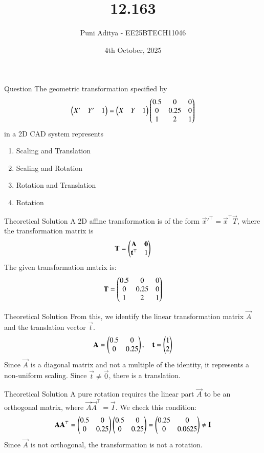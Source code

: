 \documentclass{beamer}
\title{12.163}
\date{4th October, 2025}
\author{Puni Aditya - EE25BTECH11046}
\begin{document}
\frame{\titlepage}
\begin{frame}{Question}
The geometric transformation specified by
\begin{align*}
    \begin{pmatrix}X' & Y' & 1\end{pmatrix} = \begin{pmatrix}X & Y & 1\end{pmatrix} \begin{pmatrix}0.5 & 0 & 0 \\ 0 & 0.25 & 0 \\ 1 & 2 & 1\end{pmatrix}
\end{align*}
in a 2D CAD system represents
\begin{enumerate}
    \item Scaling and Translation
    \item Scaling and Rotation
    \item Rotation and Translation
    \item Rotation
\end{enumerate}
\end{frame}

\begin{frame}{Theoretical Solution}
A 2D affine transformation is of the form $\vec{x}'^\top = \vec{x}^\top\vec{T}$, where the transformation matrix is
\begin{align*}
    \mathbf{T} = \begin{pmatrix}
        \mathbf{A} & \mathbf{0} \\
        \mathbf{t}^\top & 1
    \end{pmatrix}
\end{align*}
The given transformation matrix is:
\begin{align}
    \mathbf{T} = \begin{pmatrix}0.5 & 0 & 0 \\ 0 & 0.25 & 0 \\ 1 & 2 & 1\end{pmatrix}
\end{align}
\end{frame}

\begin{frame}{Theoretical Solution}
From this, we identify the linear transformation matrix $\vec{A}$ and the translation vector $\vec{t}$.
\begin{align}
    \mathbf{A} = \begin{pmatrix}0.5 & 0 \\ 0 & 0.25\end{pmatrix}, \quad \mathbf{t} = \begin{pmatrix}1 \\ 2\end{pmatrix}
\end{align}
Since $\vec{A}$ is a diagonal matrix and not a multiple of the identity, it represents a non-uniform scaling. Since $\vec{t} \neq \vec{0}$, there is a translation.
\end{frame}

\begin{frame}{Theoretical Solution}
A pure rotation requires the linear part $\vec{A}$ to be an orthogonal matrix, where $\vec{A}\vec{A}^\top = \vec{I}$. We check this condition:
\begin{align}
    \mathbf{A}\mathbf{A}^\top = \begin{pmatrix}0.5 & 0 \\ 0 & 0.25\end{pmatrix}\begin{pmatrix}0.5 & 0 \\ 0 & 0.25\end{pmatrix} = \begin{pmatrix}0.25 & 0 \\ 0 & 0.0625\end{pmatrix} \neq \mathbf{I}
\end{align}
Since $\vec{A}$ is not orthogonal, the transformation is not a rotation.
\end{frame}
\end{document}
